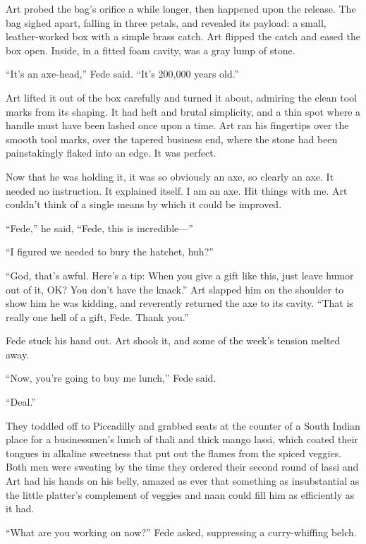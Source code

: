 Art probed the bag’s orifice a while longer, then happened upon the
release. The bag sighed apart, falling in three petals, and
revealed its payload: a small, leather-worked box with a simple
brass catch. Art flipped the catch and eased the box open. Inside,
in a fitted foam cavity, was a gray lump of stone.

“It’s an axe-head,” Fede said. “It’s 200,000 years old.”

Art lifted it out of the box carefully and turned it about,
admiring the clean tool marks from its shaping. It had heft and
brutal simplicity, and a thin spot where a handle must have been
lashed once upon a time. Art ran his fingertips over the smooth
tool marks, over the tapered business end, where the stone had been
painstakingly flaked into an edge. It was perfect.

Now that he was holding it, it was so obviously an axe, so clearly
an axe. It needed no instruction. It explained itself. I am an axe.
Hit things with me. Art couldn’t think of a single means by which
it could be improved.

“Fede,” he said, “Fede, this is incredible—”

“I figured we needed to bury the hatchet, huh?”

“God, that’s awful. Here’s a tip: When you give a gift like this,
just leave humor out of it, OK? You don’t have the knack.” Art
slapped him on the shoulder to show him he was kidding, and
reverently returned the axe to its cavity. “That is really one hell
of a gift, Fede. Thank you.”

Fede stuck his hand out. Art shook it, and some of the week’s
tension melted away.

“Now, you’re going to buy me lunch,” Fede said.

“Deal.”

They toddled off to Piccadilly and grabbed seats at the counter of
a South Indian place for a businessmen’s lunch of thali and thick
mango lassi, which coated their tongues in alkaline sweetness that
put out the flames from the spiced veggies. Both men were sweating
by the time they ordered their second round of lassi and Art had
his hands on his belly, amazed as ever that something as
insubstantial as the little platter’s complement of veggies and
naan could fill him as efficiently as it had.

“What are you working on now?” Fede asked, suppressing a
curry-whiffing belch.

